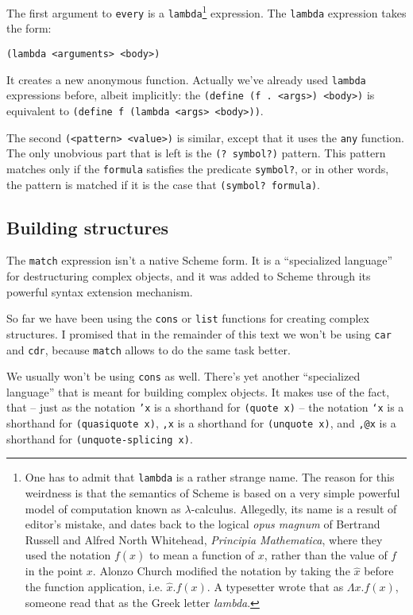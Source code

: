 The first argument to \texttt{every} is a \texttt{lambda}\footnote{
One has to admit that \texttt{lambda} is a rather strange name.
The reason for this weirdness is that the semantics of Scheme
is based on a very simple powerful model of computation known
as $\lambda$-calculus. Allegedly, its name is a result of editor's
mistake, and dates back to the logical \textit{opus magnum}
of Bertrand Russell and Alfred North Whitehead, \textit{Principia
Mathematica}, where they used the notation $f(\hat{x})$
to mean a function of $x$, rather than the value of $f$ in the
point $x$. Alonzo Church modified the notation by taking the
$\hat{x}$ before the function application, i.e. $\hat{x} . f(x)$.
A typesetter wrote that as $\Lambda x . f(x)$, someone read that
as the Greek letter \textit{lambda}\cite{Harrison1996}.} expression.
The \texttt{lambda} expression takes the form:

\texttt{(lambda <arguments> <body>)}

It creates a new anonymous function. Actually we've already used
\texttt{lambda} expressions before, albeit implicitly: the
\texttt{(define (f . <args>) <body>)} is equivalent to
\texttt{(define f (lambda <args> <body>))}.

The second \texttt{(<pattern> <value>)} is similar, except that
it uses the \texttt{any} function. The only unobvious part that is
left is the \texttt{(? symbol?)} pattern. This pattern matches
only if the \texttt{formula} satisfies the predicate \texttt{symbol?},
or in other words, the pattern is matched if it is the case that
\texttt{(symbol? formula)}.

\subsection{Building structures}

The \texttt{match} expression isn't a native Scheme form. It is
a ``specialized language'' for destructuring complex objects, and
it was added to Scheme through its powerful syntax extension
mechanism.

So far we have been using the \texttt{cons} or \texttt{list}
functions for creating complex structures. I promised that in
the remainder of this text we won't be using \texttt{car}
and \texttt{cdr}, because \texttt{match} allows to do the same
task better.

We usually won't be using \texttt{cons} as well. There's yet another
``specialized language'' that is meant for building complex objects.
It makes use of the fact, that -- just as the notation \texttt{'x}
is a shorthand for \texttt{(quote x)} -- the notation
\texttt{`x} is a shorthand for \texttt{(quasiquote x)}, 
\texttt{,x} is a shorthand for \texttt{(unquote x)}, and
\texttt{,@x} is a shorthand  for \texttt{(unquote-splicing x)}.

